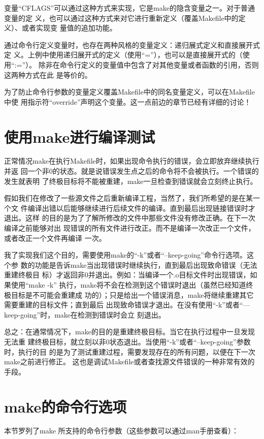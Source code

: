 变量“CFLAGS”可以通过这种方式来实现，它是make的隐含变量之一。对于普通变量的定
义，也可以通过这种方式来对它进行重新定义（覆盖Makefile中的定义）、或者实现变
量值的追加功能。

通过命令行定义变量时，也存在两种风格的变量定义：递归展式定义和直接展开式定
义。上例中使用递归展开式的定义（使用“=”），也可以是直接展开式的（使用“:=”）。
除非在命令行定义的变量值中包含了对其他变量或者函数的引用，否则这两种方式在此
是等价的。

为了防止命令行参数的变量定义覆盖Makefile中的同名变量定义，可以在Makefile中使
用指示符“override”声明这个变量。这一点前边的章节已经有详细的讨论！


\section{使用make进行编译测试}

正常情况make在执行Makefile时，如果出现命令执行的错误，会立即放弃继续执行并返
回一个非0的状态。就是说错误发生点之后的命令将不会被执行。一个错误的发生就表明
了终极目标将不能被重建，make一旦检查到错误就会立刻终止执行。

假如我们在修改了一些源文件之后重新编译工程，当然了，我们所希望的是在某一个文
件编译出错以后能够继续进行后续文件的编译。直到最后出现链接错误时才退出。这样
的目的是为了了解所修改的文件中那些文件没有修改正确。在下一次编译之前能够对出
现错误的所有文件进行改正。而不是编译一次改正一个文件，或者改正一个文件再编译
一次。

我了实现我们这个目的，需要使用make的“-k”或者“--keep-going”命令行选项。这个参
数的功能是告诉make当出现错误时继续执行，直到最后出现致命错误（无法重建终极目
标）才返回非0并退出。例如：当编译一个.o目标文件时出现错误，如果使用“make -k”
执行，make将不会在检测到这个错误时退出（虽然已经知道终极目标是不可能会重建成
功的）；只是给出一个错误消息，make将继续重建其它需要重建的目标文件；直到最后
出现致命错误才退出。在没有使用“-k”或者“—keep-going”时，make在检测到错误时会立
刻退出。

总之：在通常情况下，make的目的是重建终极目标。当它在执行过程中一旦发现无法重
建终极目标，就立刻以非0状态退出。当使用“-k”或者“--keep-going”参数时，执行的目
的是为了测试重建过程，需要发现存在的所有问题，以便在下一次make之前进行修正。
这也是调试Makefile或者查找源文件错误的一种非常有效的手段。


\section{make的命令行选项}
本节罗列了make 所支持的命令行参数（这些参数可以通过man手册查看）：


